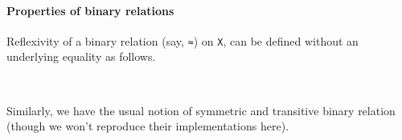\documentclass[a4paper,UKenglish,cleveref, autoref, thm-restate]{lipics-v2019}
\begin{document}

\paragraph*{Properties of binary relations}\label{properties-of-binary-relations}
Reflexivity of a binary relation (say, \texttt{≈}) on \texttt{X}, can be defined without an underlying equality as follows.
\begin{code}
\>[0]\AgdaSpace{}%
\AgdaSymbol{:}\AgdaSpace{}%
\AgdaSymbol{\{}\AgdaSpace{}%
\AgdaSymbol{:}\AgdaSpace{}%
\AgdaSpace{}%
\AgdaSpace{}%
\AgdaSymbol{\}}\AgdaSpace{}%
\AgdaSpace{}%
\AgdaSpace{}%
\AgdaSpace{}%
\AgdaSpace{}%
\AgdaSpace{}%
\AgdaSpace{}%
\AgdaSpace{}%
\AgdaSpace{}%
\<%
\\
\>[0]\AgdaSpace{}%
\AgdaSpace{}%
\AgdaSymbol{=}\AgdaSpace{}%
\AgdaSpace{}%
\AgdaSpace{}%
\AgdaSpace{}%
\AgdaSpace{}%
\AgdaSpace{}%
\<%
\end{code}
Similarly, we have the usual notion of symmetric and transitive binary relation (though we won't reproduce their implementations here).
\end{document}
